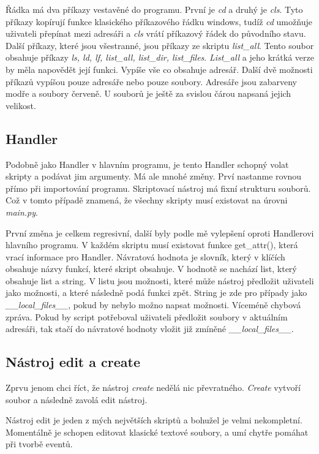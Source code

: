 \documentclass[12pt,a4paper]{article}
\begin{document}
Řádka má dva příkazy vestavěné do programu. První je \textit{cd} a druhý je \textit{cls}. Tyto příkazy kopírují funkce klasického příkazového řádku windows, tudíž \textit{cd} umožňuje uživateli přepínat mezi adresáři a \textit{cls} vrátí příkazový řádek do původního stavu. Další příkazy, které jsou všestranné, jsou příkazy ze skriptu \textit{list\_all}. Tento soubor obsahuje příkazy \textit{ls, ld, lf, list\_all, list\_dir, list\_files}. \textit{List\_all} a jeho krátká verze by měla napovědět její funkci. Vypíše vše co obsahuje adresář. Další dvě možnosti příkazů vypíšou pouze adresáře nebo pouze soubory. Adresáře jsou zabarveny modře a soubory červeně. U souborů je ještě za svislou čárou napsaná jejich velikost.
\subsection{Handler}
Podobně jako Handler v hlavním programu, je tento Handler schopný volat skripty a podávat jim argumenty. Má ale mnohé změny. Prví nastanme rovnou přímo při importování programu. Skriptovací nástroj má fixní strukturu souborů. Což v tomto případě znamená, že všechny skripty musí existovat na úrovni \textit{main.py}. 

První změna je celkem regresivní, další byly podle mě vylepšení oproti Handlerovi hlavního programu. V každém skriptu musí existovat funkce get\_attr(), která vrací informace pro Handler. Návratová hodnota je slovník, který v klíčích obsahuje názvy funkcí, které skript obsahuje. V hodnotě se nachází list, který obsahuje list a string. V listu jsou možnosti, které může nástroj předložit uživateli jako možnosti, a které následně podá funkci zpět. String je zde pro případy jako  \textit{\_\_local\_files\_\_}, pokud by nebylo možno napsat možnosti. Víceméně chybová zpráva. Pokud by script potřeboval uživateli předložit soubory v aktuálním adresáři, tak stačí do návratové hodnoty vložit již zmíněné \textit{\_\_local\_files\_\_}.

\subsection{Nástroj edit a create}
Zprvu jenom chci říct, že nástroj \textit{create} nedělá nic převratného. \textit{Create} vytvoří soubor a následně zavolá edit nástroj.

Nástroj edit je jeden z mých největších skriptů a bohužel je velmi nekompletní. Momentálně je schopen editovat klasické textové soubory, a umí chytře pomáhat při tvorbě eventů. 
\end{document}
